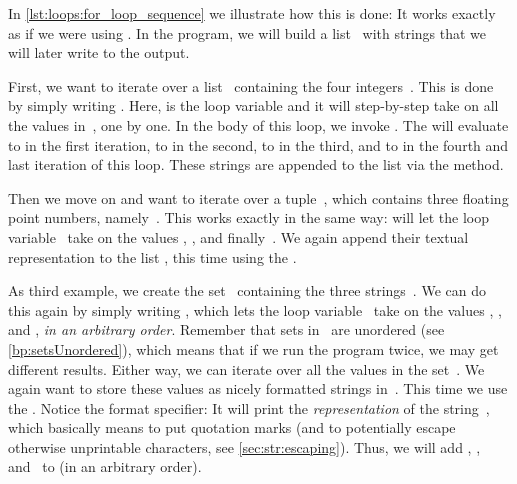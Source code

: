In \cref{lst:loops:for_loop_sequence} we illustrate how this is done:
It works exactly as if we were using .
In the program, we will build a list~ with strings that we will later write to the output.

First, we want to iterate over a list~ containing the four integers~\pythonil{[1, 2, 3, 50]}.
This is done by simply writing .
Here,  is the loop variable and it will step-by-step take on all the values in~, one by one.
In the body of this loop, we invoke .
The  will evaluate to  in the first iteration, to  in the second, to  in the third, and to  in the fourth and last iteration of this loop.
These strings are appended to the list  via the  method.

Then we move on and want to iterate over a tuple~, which contains three floating point numbers, namely~.
This works exactly in the same way:
 will let the loop variable~ take on the values , , and finally~.
We again append their textual representation to the list , this time using the  .

As third example, we create the set~ containing the three strings~.
We can do this again by simply writing , which lets the loop variable~ take on the values , , and , \emph{in an arbitrary order}.
Remember that sets in \python\ are unordered (see \cref{bp:setsUnordered}), which means that if we run the program twice, we may get different results.
Either way, we can iterate over all the values in the set~.
We again want to store these values as nicely formatted strings in~.
This time we use the  .
Notice the  format specifier:
It will print the \emph{representation} of the string~, which basically means to put quotation marks (and to potentially escape otherwise unprintable characters, see \cref{sec:str:escaping}).
Thus, we will add , , and~ to  (in an arbitrary order).

